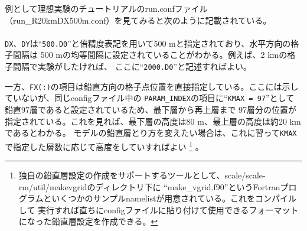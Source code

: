 例として理想実験のチュートリアルのrun.confファイル（run\_R20kmDX500m.conf）を見てみると次のように記載されている。\\

\\

\verb|DX|、\verb|DY|は``\verb|500.D0|''と倍精度表記を用いて500 mと指定されており、水平方向の格子間隔は
500 mの均等間隔に設定されていることがわかる。例えば、2 kmの格子間隔で実験がしたければ、
ここに``\verb|2000.D0|''と記述すればよい。

一方、\verb|FX(:)|の項目は鉛直方向の格子点位置を直接指定している。ここには示していないが、同じconfigファイル中の
\verb|PARAM_INDEX|の項目に``\verb|KMAX = 97|''として鉛直97層であると設定されているため、最下層から再上層まで
97層分の位置が指定されている。これを見れば、最下層の高度は80 m、最上層の高度は約20 kmであるとわかる。
モデルの鉛直層とり方を変えたい場合は、これに習って\verb|KMAX|で指定した層数に応じて高度をしていすればよい
\footnote{独自の鉛直層設定の作成をサポートするツールとして、scale/scale-rm/util/makevgridのディレクトリ下に
``make\_vgrid.f90''というFortranプログラムといくつかのサンプルnamelistが用意されている。これをコンパイルして
実行すれば直ちにconfigファイルに貼り付けて使用できるフォーマットになった鉛直層設定を作成できる。}
。


